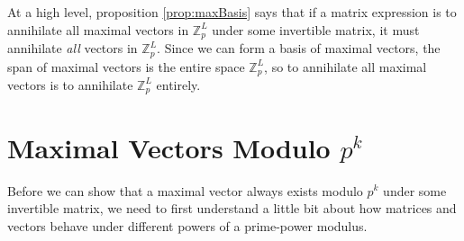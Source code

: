 \documentclass[a4paper, 12pt, reqno]{amsart}
\begin{document}
		At a high level, proposition \ref{prop:maxBasis} says that if a matrix expression is to annihilate all maximal vectors in $\mathds{Z}_p^L$ under some invertible 
		matrix, it must annihilate \emph{all} vectors in $\mathds{Z}_p^L$. Since we can form a basis of maximal vectors, the span of maximal vectors is the entire space
		$\mathds{Z}_p^L$, so to annihilate all maximal vectors is to annihilate $\mathds{Z}_p^L$ entirely.
	
	\section{Maximal Vectors Modulo $p^k$}
		Before we can show that a maximal vector always exists modulo $p^k$ under some invertible matrix, we need to first understand a little bit about how matrices and
		vectors behave under different powers of a prime-power modulus.
		
\end{document}

